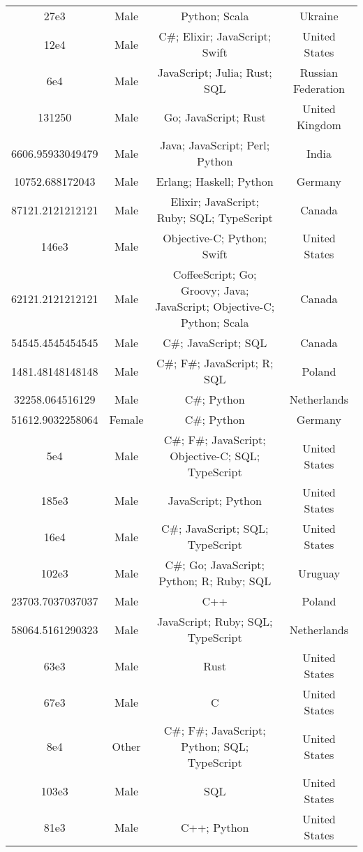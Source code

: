 \begin{center}
\begin{tabular}{ |c|c|c|c| }
27e3  &  Male  &  Python; Scala  &  Ukraine  \\ 
12e4  &  Male  &  C\#; Elixir; JavaScript; Swift  &  United States  \\ 
6e4  &  Male  &  JavaScript; Julia; Rust; SQL  &  Russian Federation  \\ 
131250  &  Male  &  Go; JavaScript; Rust  &  United Kingdom  \\ 
6606.95933049479  &  Male  &  Java; JavaScript; Perl; Python  &  India  \\ 
10752.688172043  &  Male  &  Erlang; Haskell; Python  &  Germany  \\ 
87121.2121212121  &  Male  &  Elixir; JavaScript; Ruby; SQL; TypeScript  &  Canada  \\ 
146e3  &  Male  &  Objective-C; Python; Swift  &  United States  \\ 
62121.2121212121  &  Male  &  CoffeeScript; Go; Groovy; Java; JavaScript; Objective-C; Python; Scala  &  Canada  \\ 
54545.4545454545  &  Male  &  C\#; JavaScript; SQL  &  Canada  \\ 
1481.48148148148  &  Male  &  C\#; F\#; JavaScript; R; SQL  &  Poland  \\ 
32258.064516129  &  Male  &  C\#; Python  &  Netherlands  \\ 
51612.9032258064  &  Female  &  C\#; Python  &  Germany  \\ 
5e4  &  Male  &  C\#; F\#; JavaScript; Objective-C; SQL; TypeScript  &  United States  \\ 
185e3  &  Male  &  JavaScript; Python  &  United States  \\ 
16e4  &  Male  &  C\#; JavaScript; SQL; TypeScript  &  United States  \\ 
102e3  &  Male  &  C\#; Go; JavaScript; Python; R; Ruby; SQL  &  Uruguay  \\ 
23703.7037037037  &  Male  &  C++  &  Poland  \\ 
58064.5161290323  &  Male  &  JavaScript; Ruby; SQL; TypeScript  &  Netherlands  \\ 
63e3  &  Male  &  Rust  &  United States  \\ 
67e3  &  Male  &  C  &  United States  \\ 
8e4  &  Other  &  C\#; F\#; JavaScript; Python; SQL; TypeScript  &  United States  \\ 
103e3  &  Male  &  SQL  &  United States  \\ 
81e3  &  Male  &  C++; Python  &  United States  \\ 

\end{tabular}
\end{center}

